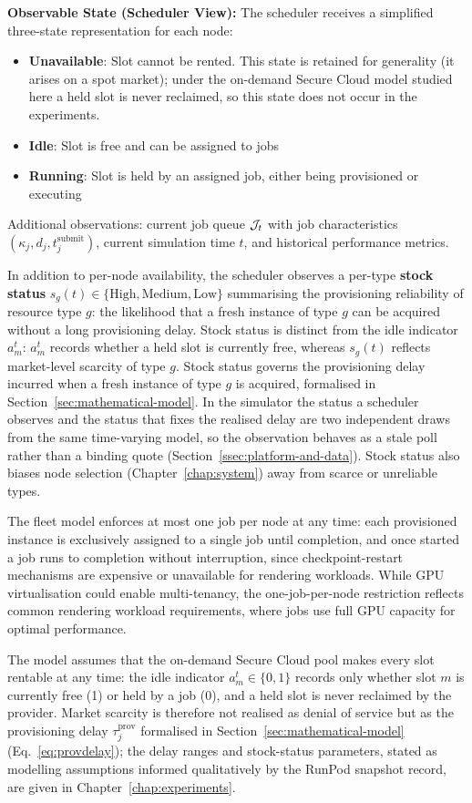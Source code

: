 \textbf{Observable State (Scheduler View):} The scheduler receives a simplified three-state representation for each node:
\begin{itemize}
\item \textbf{Unavailable}: Slot cannot be rented. This state is retained for generality (it arises on a spot market); under the on-demand Secure Cloud model studied here a held slot is never reclaimed, so this state does not occur in the experiments.
\item \textbf{Idle}: Slot is free and can be assigned to jobs
\item \textbf{Running}: Slot is held by an assigned job, either being provisioned or executing
\end{itemize}
Additional observations: current job queue $\mathcal{J}_t$ with job characteristics $(\kappa_j, d_j, t_j^{\text{submit}})$, current simulation time $t$, and historical performance metrics.

In addition to per-node availability, the scheduler observes a per-type \textbf{stock status} $s_g(t) \in \{\text{High}, \text{Medium}, \text{Low}\}$ summarising the provisioning reliability of resource type $g$: the likelihood that a fresh instance of type $g$ can be acquired without a long provisioning delay. Stock status is distinct from the idle indicator $a_m^t$: $a_m^t$ records whether a held slot is currently free, whereas $s_g(t)$ reflects market-level scarcity of type $g$. Stock status governs the provisioning delay incurred when a fresh instance of type $g$ is acquired, formalised in Section~\ref{sec:mathematical-model}. In the simulator the status a scheduler observes and the status that fixes the realised delay are two independent draws from the same time-varying model, so the observation behaves as a stale poll rather than a binding quote (Section~\ref{ssec:platform-and-data}). Stock status also biases node selection (Chapter~\ref{chap:system}) away from scarce or unreliable types.

The fleet model enforces at most one job per node at any time: each provisioned instance is exclusively assigned to a single job until completion, and once started a job runs to completion without interruption, since checkpoint-restart mechanisms are expensive or unavailable for rendering workloads. While GPU virtualisation could enable multi-tenancy, the one-job-per-node restriction reflects common rendering workload requirements, where jobs use full GPU capacity for optimal performance.

The model assumes that the on-demand Secure Cloud pool makes every slot rentable at any time: the idle indicator $a_m^t \in \{0,1\}$ records only whether slot $m$ is currently free (1) or held by a job (0), and a held slot is never reclaimed by the provider. Market scarcity is therefore not realised as denial of service but as the provisioning delay $\tau^{\text{prov}}_j$ formalised in Section~\ref{sec:mathematical-model} (Eq.~\ref{eq:provdelay}); the delay ranges and stock-status parameters, stated as modelling assumptions informed qualitatively by the RunPod snapshot record, are given in Chapter~\ref{chap:experiments}.

